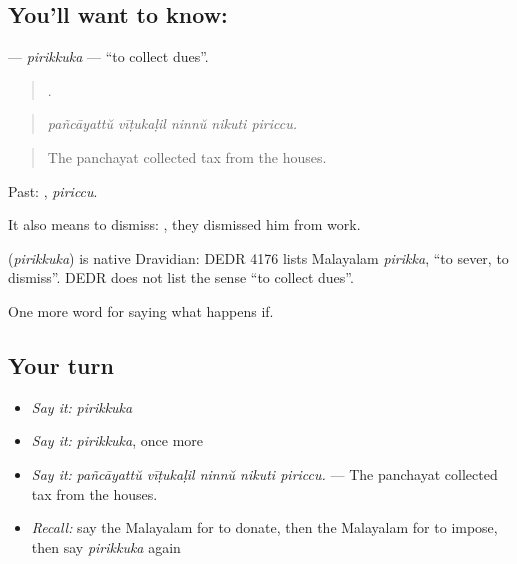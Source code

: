 \subsection*{You'll want to know: }
\textbf{} — \emph{pirikkuka} — \textquotedblleft{}to collect dues\textquotedblright{}.

\begin{quote}
    .
\end{quote}

\begin{quote}
\emph{pañcāyattŭ vīṭukaḷil ninnŭ nikuti piriccu.}
\end{quote}

\begin{quote}
The panchayat collected tax from the houses.
\end{quote}

Past: , \emph{piriccu}.

It also means to dismiss:    , they dismissed him from work.

\begin{cousinweb}
\textbf{} (\emph{pirikkuka}) is native Dravidian: DEDR 4176 lists Malayalam \emph{pirikka}, \textquotedblleft{}to sever, to dismiss\textquotedblright{}. DEDR does not list the sense \textquotedblleft{}to collect dues\textquotedblright{}.
\end{cousinweb}

\begin{grammarlens}[title={What you've built}]
One more word for saying what happens if.
\end{grammarlens}

\subsection*{Your turn}
\begin{itemize}
\raggedright
  \item \emph{Say it:} \emph{pirikkuka}
  \item \emph{Say it:} \emph{pirikkuka}, once more
  \item \emph{Say it:} \emph{pañcāyattŭ vīṭukaḷil ninnŭ nikuti piriccu.} — The panchayat collected tax from the houses.
  \item \emph{Recall:} say the Malayalam for to donate, then the Malayalam for to impose, then say \emph{pirikkuka} again
\end{itemize}

